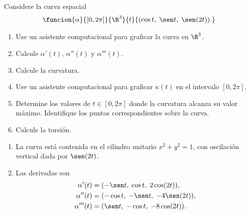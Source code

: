 \documentclass[11pt,respuestas,a4]{aleph-examen}
\begin{document}
\begin{preguntas}
\item
Considere la curva espacial
\[
    \funcion{\alpha}{[0,2\pi]}{\R^3}{t}{(\cos t,\;\sen t,\;\sen(2t)).}
\]
\begin{enumerate}
    \item Use un asistente computacional para graficar la curva en $\R^3$.
    \item Calcule $\alpha'(t)$, $\alpha''(t)$ y $\alpha'''(t)$.
    \item Calcule la curvatura.
    \item Use un asistente computacional para graficar $\kappa(t)$ en el intervalo $[0,2\pi]$.
    \item Determine los valores de $t\in[0,2\pi]$ donde la curvatura alcanza su valor máximo. Identifique los puntos correspondientes sobre la curva.
    \item Calcule la torsión.
\end{enumerate}

\begin{respuesta}\hspace{0pt}
\begin{enumerate}
    \item La curva está contenida en el cilindro unitario \(x^2+y^2=1\), con oscilación vertical dada por \(\sen(2t)\).

    \begin{center}
    \end{center}

    \item Las derivadas son
    \begin{align*}
        \alpha'(t)   &= (-\sen t,\;\cos t,\;2\cos(2t)),\\
        \alpha''(t)  &= (-\cos t,\;-\sen t,\;-4\sen(2t)),\\
        \alpha'''(t) &= (\sen t,\;-\cos t,\;-8\cos(2t)).
    \end{align*}


\end{enumerate}
\end{respuesta}
\end{preguntas}
\end{document}
